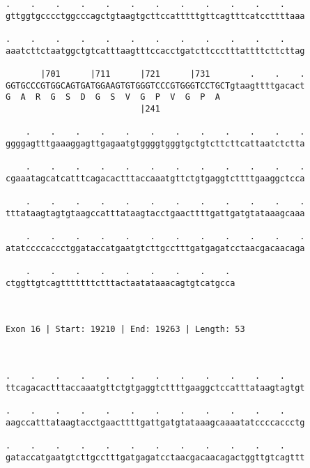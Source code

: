 \documentclass{article}
\begin{document}
\begin{Verbatim}
.    .    .    .    .    .    .    .    .    .    .    .    
gttggtgcccctggcccagctgtaagtgcttccatttttgttcagtttcatccttttaaa
                                                            
.    .    .    .    .    .    .    .    .    .    .    .    
aaatcttctaatggctgtcatttaagtttccacctgatcttccctttattttcttcttag
                                                            
       |701      |711      |721      |731        .    .    .
GGTGCCCGTGGCAGTGATGGAAGTGTGGGTCCCGTGGGTCCTGCTgtaagttttgacact
G  A  R  G  S  D  G  S  V  G  P  V  G  P  A                 
                           |241                             
  
    .    .    .    .    .    .    .    .    .    .    .    .
ggggagtttgaaaggagttgagaatgtggggtgggtgctgtcttcttcattaatctctta
                                                            
    .    .    .    .    .    .    .    .    .    .    .    .
cgaaatagcatcatttcagacactttaccaaatgttctgtgaggtcttttgaaggctcca
                                                            
    .    .    .    .    .    .    .    .    .    .    .    .
tttataagtagtgtaagccatttataagtacctgaacttttgattgatgtataaagcaaa
                                                            
    .    .    .    .    .    .    .    .    .    .    .    .
atatccccaccctggataccatgaatgtcttgcctttgatgagatcctaacgacaacaga
                                                            
    .    .    .    .    .    .    .    .    . 
ctggttgtcagtttttttctttactaatataaacagtgtcatgcca
                                              
                                              
 
Exon 16 | Start: 19210 | End: 19263 | Length: 53



.    .    .    .    .    .    .    .    .    .    .    .    
ttcagacactttaccaaatgttctgtgaggtcttttgaaggctccatttataagtagtgt
                                                            
.    .    .    .    .    .    .    .    .    .    .    .    
aagccatttataagtacctgaacttttgattgatgtataaagcaaaatatccccaccctg
                                                            
.    .    .    .    .    .    .    .    .    .    .    .    
gataccatgaatgtcttgcctttgatgagatcctaacgacaacagactggttgtcagttt
                                                            

\end{Verbatim}
\end{document}
